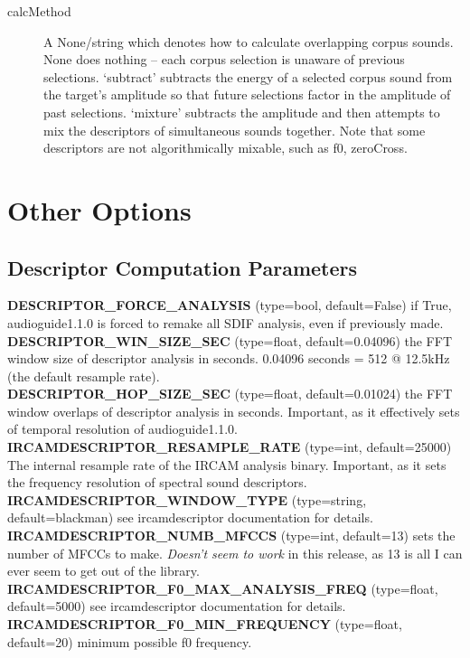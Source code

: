 \documentclass{article}
\newcommand{\optEntry}[4]{\textbf{#1} (type=#2, default=#3) #4\hspace{0.5em}\\}
\newcommand{\ag}{audioguide1.1.0\xspace}
\begin{document}
\begin{spacing}{1.2}
\begin{description}
\item[calcMethod] A None/string which denotes how to calculate overlapping corpus sounds.  None does nothing -- each corpus selection is unaware of previous selections.  `subtract' subtracts the energy of a selected corpus sound from the target's amplitude so that future selections factor in the amplitude of past selections.  `mixture' subtracts the amplitude and then attempts to mix the descriptors of simultaneous sounds together.  Note that some descriptors are not algorithmically mixable, such as f0, zeroCross.
\end{description}




\section{Other Options}\label{otheroptions}
\subsection{Descriptor Computation Parameters}
\optEntry{DESCRIPTOR\_FORCE\_ANALYSIS}{bool}{False}{if True, \ag is forced to remake all SDIF analysis, even if previously made.}

\optEntry{DESCRIPTOR\_WIN\_SIZE\_SEC}{float}{0.04096}{the FFT window size of descriptor analysis in seconds.  0.04096 seconds = 512 @ 12.5kHz (the default resample rate).}

\optEntry{DESCRIPTOR\_HOP\_SIZE\_SEC}{float}{0.01024}{the FFT window overlaps of descriptor analysis in seconds.  Important, as it effectively sets of temporal resolution of \ag.}

\optEntry{IRCAMDESCRIPTOR\_RESAMPLE\_RATE}{int}{25000}{The internal resample rate of the IRCAM analysis binary.  Important, as it sets the frequency resolution of spectral sound descriptors.}

\optEntry{IRCAMDESCRIPTOR\_WINDOW\_TYPE}{string}{blackman}{see ircamdescriptor documentation for details.}

\optEntry{IRCAMDESCRIPTOR\_NUMB\_MFCCS}{int}{13}{sets the number of MFCCs to make.  \emph{Doesn't seem to work} in this release, as 13 is all I can ever seem to get out of the library.}

\optEntry{IRCAMDESCRIPTOR\_F0\_MAX\_ANALYSIS\_FREQ}{float}{5000}{see ircamdescriptor documentation for details.}

\optEntry{IRCAMDESCRIPTOR\_F0\_MIN\_FREQUENCY}{float}{20}{minimum possible f0 frequency.}


\end{spacing}
\end{document}
